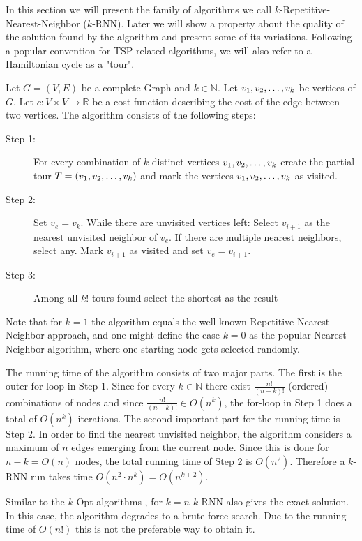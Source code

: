 In this section we will present the family of algorithms we call $k$-Repetitive-Nearest-Neighbor ($k$-RNN). 
Later we will show a property about the quality of the solution found by the algorithm and present some of its variations.
Following a popular convention for TSP-related algorithms, we will also refer to a Hamiltonian cycle as a "tour". 	

Let $G = (V, E)$ be a complete Graph and $k \in \mathbb{N}$. Let $v_1, v_2, \mathellipsis, v_k$ be vertices of $G$. 
Let $c: V \times V \rightarrow \mathbb{R}$ be a cost function describing the cost of the edge between two vertices. 
The algorithm consists of the following steps:


\begin{description}
	\item[Step 1:] For every combination of $k$ distinct vertices $v_1, v_2, \mathellipsis, v_k$ create the partial tour $T = (v_1, v_2, \mathellipsis, v_k)$ and mark the vertices $v_1, v_2, \mathellipsis, v_k$ as visited.
	
	\item[Step 2:] Set $v_e = v_k$. While there are unvisited vertices left: 
	Select $v_{i+1}$ as the nearest unvisited neighbor of $v_e$. 
	If there are multiple nearest neighbors, select any.
	Mark $v_{i+1}$ as visited and set $v_e = v_{i+1}$.
	
	\item[Step 3:] Among all $k!$ tours found select the shortest as the result
\end{description}	

Note that for $k = 1$ the algorithm equals the well-known Repetitive-Nearest-Neighbor approach, and one might define the case $k = 0$ as the popular Nearest-Neighbor algorithm, where one starting node gets selected randomly.

The running time of the algorithm consists of two major parts. 
The first is the outer for-loop in Step 1. 
Since for every $k \in \mathbb{N}$ there exist $\frac{n!}{(n-k)!}$ (ordered) combinations of nodes and since $\frac{n!}{(n-k)!} \in O(n^k)$, the for-loop in Step 1 does a total of $O(n^k)$ iterations.
The second important part for the running time is Step 2. In order to find the nearest unvisited neighbor, the algorithm considers a maximum of $n$ edges emerging from the current node. 
Since this is done for $n - k = O(n)$ nodes, the total running time of Step 2 is $O(n^2)$.
Therefore a $k$-RNN run takes time $O(n^2 \cdot n^k) = O(n^{k+2})$.

Similar to the $k$-Opt algorithms \cite{CROES1958, LIN1973}, for $k = n$ $k$-RNN also gives the exact solution. In this case, the algorithm degrades to a brute-force search.
Due to the running time of $O(n!)$ this is not the preferable way to obtain it.

